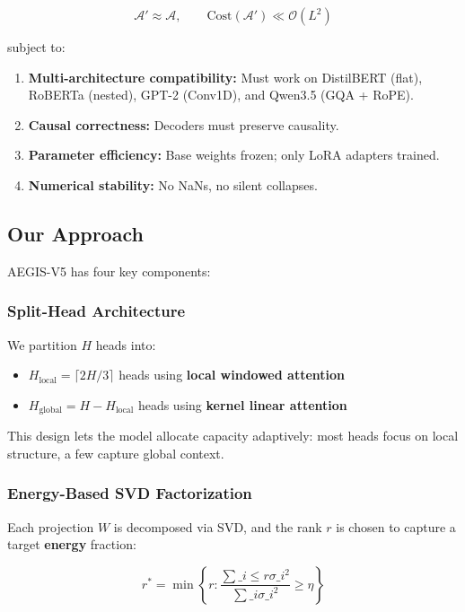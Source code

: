 \[
\mathcal{A}' \approx \mathcal{A}, \qquad
\text{Cost}(\mathcal{A}') \ll \mathcal{O}(L^2)
\]

subject to:

\begin{enumerate}
\item \textbf{Multi-architecture compatibility:} Must work on DistilBERT (flat),
  RoBERTa (nested), GPT-2 (Conv1D), and Qwen3.5 (GQA + RoPE).
\item \textbf{Causal correctness:} Decoders must preserve causality.
\item \textbf{Parameter efficiency:} Base weights frozen; only LoRA adapters trained.
\item \textbf{Numerical stability:} No NaNs, no silent collapses.

\end{enumerate}
\subsection{Our Approach}

AEGIS-V5 has four key components:

\subsubsection{Split-Head Architecture}

We partition $H$ heads into:

\begin{itemize}
\item $H_\text{local} = \lceil 2H/3 \rceil$ heads using \textbf{local windowed attention}
\item $H_\text{global} = H - H_\text{local}$ heads using \textbf{kernel linear attention}

\end{itemize}
This design lets the model allocate capacity adaptively: most heads focus 
on local structure, a few capture global context.

\subsubsection{Energy-Based SVD Factorization}

Each projection $W$ is decomposed via SVD, and the rank $r$ is chosen to 
capture a target \textbf{energy} fraction:

\[
r^* = \min \left\{ r : \frac{\sum\_{i \leq r} \sigma\_i^2}{\sum\_i \sigma\_i^2} \geq \eta \right\}
\]

